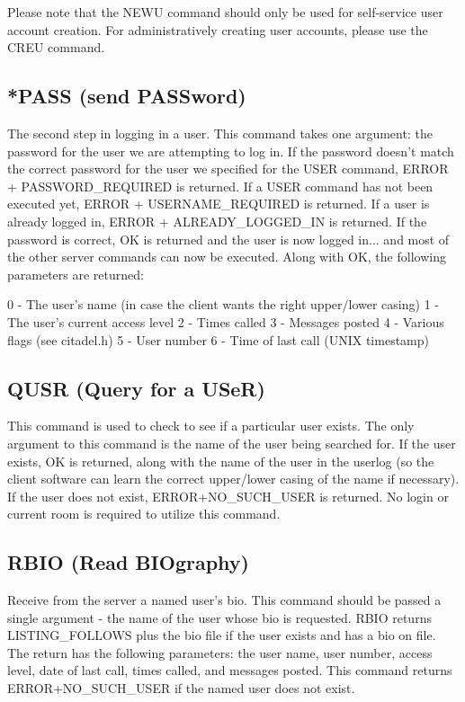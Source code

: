  Please note that the NEWU command should only be used for self-service
user account creation.  For administratively creating user accounts, please
use the CREU command.



\subsection{*PASS (send PASSword)}

 The second step in logging in a user.  This command takes one argument: the
password for the user we are attempting to log in.  If the password doesn't
match the correct password for the user we specified for the USER command,
ERROR + PASSWORD_REQUIRED is returned.  If a USER command has not been
executed yet, ERROR + USERNAME_REQUIRED is returned.  If a user is already
logged in, ERROR + ALREADY_LOGGED_IN is returned.  If the password is
correct, OK is returned and the user is now logged in... and most of the
other server commands can now be executed.  Along with OK, the following
parameters are returned:

 0 - The user's name (in case the client wants the right upper/lower casing)
 1 - The user's current access level
 2 - Times called
 3 - Messages posted
 4 - Various flags (see citadel.h)
 5 - User number
 6 - Time of last call (UNIX timestamp)



\subsection{QUSR (Query for a USeR)}

 This command is used to check to see if a particular user exists.  The only
argument to this command is the name of the user being searched for.  If
the user exists, OK is returned, along with the name of the user in the userlog
(so the client software can learn the correct upper/lower casing of the name
if necessary).  If the user does not exist, ERROR+NO_SUCH_USER is returned.
No login or current room is required to utilize this command.



\subsection{RBIO (Read BIOgraphy)}

 Receive from the server a named user's bio.  This command should be passed
a single argument - the name of the user whose bio is requested.  RBIO returns
LISTING_FOLLOWS plus the bio file if the user exists and has a bio on file.
The return has the following parameters:  the user name, user number, access
level, date of last call, times called, and messages posted.  This command
returns ERROR+NO_SUCH_USER if the named user does not exist.

